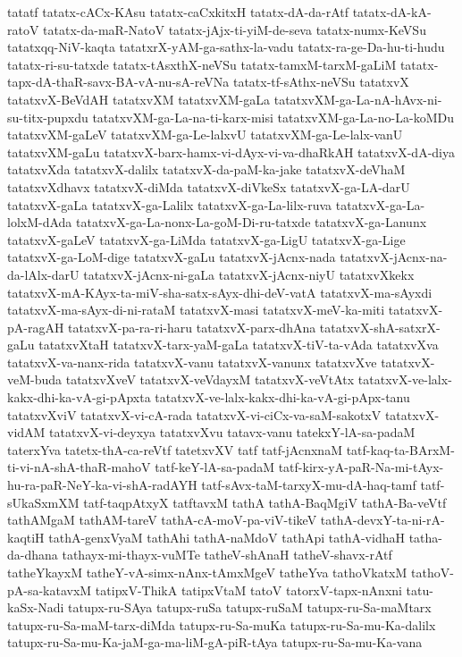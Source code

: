 {tatatf
tatatx-cACx-KAsu
tatatx-caCxkitxH
tatatx-dA-da-rAtf
tatatx-dA-kA-ratoV
tatatx-da-maR-NatoV
tatatx-jAjx-ti-yiM-de-seva
tatatx-numx-KeVSu
tatatxqq-NiV-kaqta
tatatxrX-yAM-ga-sathx-la-vadu
tatatx-ra-ge-Da-hu-ti-hudu
tatatx-ri-su-tatxde
tatatx-tAsxthX-neVSu
tatatx-tamxM-tarxM-gaLiM
tatatx-tapx-dA-thaR-savx-BA-vA-nu-sA-reVNa
tatatx-tf-sAthx-neVSu
tatatxvX
tatatxvX-BeVdAH
tatatxvXM
tatatxvXM-gaLa
tatatxvXM-ga-La-nA-hAvx-ni-su-titx-pupxdu
tatatxvXM-ga-La-na-ti-karx-misi
tatatxvXM-ga-La-no-La-koMDu
tatatxvXM-gaLeV
tatatxvXM-ga-Le-lalxvU
tatatxvXM-ga-Le-lalx-vanU
tatatxvXM-gaLu
tatatxvX-barx-hamx-vi-dAyx-vi-va-dhaRkAH
tatatxvX-dA-diya
tatatxvXda
tatatxvX-dalilx
tatatxvX-da-paM-ka-jake
tatatxvX-deVhaM
tatatxvXdhavx
tatatxvX-diMda
tatatxvX-diVkeSx
tatatxvX-ga-LA-darU
tatatxvX-gaLa
tatatxvX-ga-Lalilx
tatatxvX-ga-La-lilx-ruva
tatatxvX-ga-La-lolxM-dAda
tatatxvX-ga-La-nonx-La-goM-Di-ru-tatxde
tatatxvX-ga-Lanunx
tatatxvX-gaLeV
tatatxvX-ga-LiMda
tatatxvX-ga-LigU
tatatxvX-ga-Lige
tatatxvX-ga-LoM-dige
tatatxvX-gaLu
tatatxvX-jAcnx-nada
tatatxvX-jAcnx-na-da-lAlx-darU
tatatxvX-jAcnx-ni-gaLa
tatatxvX-jAcnx-niyU
tatatxvXkekx
tatatxvX-mA-KAyx-ta-miV-sha-satx-sAyx-dhi-deV-vatA
tatatxvX-ma-sAyxdi
tatatxvX-ma-sAyx-di-ni-rataM
tatatxvX-masi
tatatxvX-meV-ka-miti
tatatxvX-pA-ragAH
tatatxvX-pa-ra-ri-haru
tatatxvX-parx-dhAna
tatatxvX-shA-satxrX-gaLu
tatatxvXtaH
tatatxvX-tarx-yaM-gaLa
tatatxvX-tiV-ta-vAda
tatatxvXva
tatatxvX-va-nanx-rida
tatatxvX-vanu
tatatxvX-vanunx
tatatxvXve
tatatxvX-veM-buda
tatatxvXveV
tatatxvX-veVdayxM
tatatxvX-veVtAtx
tatatxvX-ve-lalx-kakx-dhi-ka-vA-gi-pApxta
tatatxvX-ve-lalx-kakx-dhi-ka-vA-gi-pApx-tanu
tatatxvXviV
tatatxvX-vi-cA-rada
tatatxvX-vi-ciCx-va-saM-sakotxV
tatatxvX-vidAM
tatatxvX-vi-deyxya
tatatxvXvu
tatavx-vanu
tatekxY-lA-sa-padaM
taterxYva
tatetx-thA-ca-reVtf
tatetxvXV
tatf
tatf-jAcnxnaM
tatf-kaq-ta-BArxM-ti-vi-nA-shA-thaR-mahoV
tatf-keY-lA-sa-padaM
tatf-kirx-yA-paR-Na-mi-tAyx-hu-ra-paR-NeY-ka-vi-shA-radAYH
tatf-sAvx-taM-tarxyX-mu-dA-haq-tamf
tatf-sUkaSxmXM
tatf-taqpAtxyX
tatftavxM
tathA
tathA-BaqMgiV
tathA-Ba-veVtf
tathAMgaM
tathAM-tareV
tathA-cA-moV-pa-viV-tikeV
tathA-devxY-ta-ni-rA-kaqtiH
tathA-genxVyaM
tathAhi
tathA-naMdoV
tathApi
tathA-vidhaH
tatha-da-dhana
tathayx-mi-thayx-vuMTe
tatheV-shAnaH
tatheV-shavx-rAtf
tatheYkayxM
tatheY-vA-simx-nAnx-tAmxMgeV
tatheYva
tathoVkatxM
tathoV-pA-sa-katavxM
tatipxV-ThikA
tatipxVtaM
tatoV
tatorxV-tapx-nAnxni
tatu-kaSx-Nadi
tatupx-ru-SAya
tatupx-ruSa
tatupx-ruSaM
tatupx-ru-Sa-maMtarx
tatupx-ru-Sa-maM-tarx-diMda
tatupx-ru-Sa-muKa
tatupx-ru-Sa-mu-Ka-dalilx
tatupx-ru-Sa-mu-Ka-jaM-ga-ma-liM-gA-piR-tAya
tatupx-ru-Sa-mu-Ka-vana
}
